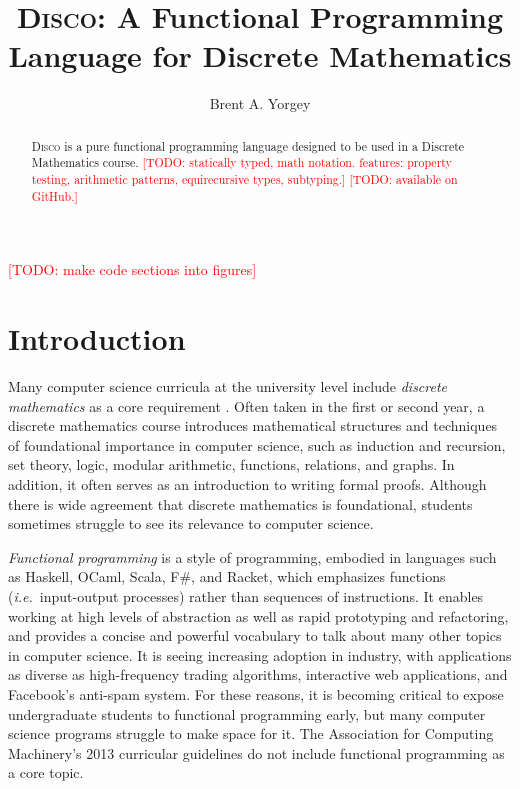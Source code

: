 \documentclass[submission,copyright,creativecommons]{eptcs}
\title{\textsc{Disco}: A Functional Programming Language for Discrete Mathematics}
\author{Brent A. Yorgey
\institute{Hendrix College\\ Conway, Arkansas, USA}
\email{yorgey@hendrix.edu}
}
\newcommand{\disco}{\textsc{Disco}\xspace}
\newcommand{\todo}[1]{\textcolor{red}{[TODO: #1]}}
\newcommand{\todo}[1]{}
\begin{document}
\maketitle

\todo{make code sections into figures}

\begin{abstract}
  \disco is a pure functional programming language designed to be used
  in a Discrete Mathematics course. \todo{statically typed, math
  notation. features: property testing, arithmetic patterns, equirecursive
  types, subtyping.}
  \todo{available on GitHub.}
\end{abstract}

\section{Introduction}
\label{sec:introduction}

Many computer science curricula at the university level include
\emph{discrete mathematics} as a core requirement \cite{ACM:2013}.
Often taken in the first or second year, a discrete mathematics course
introduces mathematical structures and techniques of foundational
importance in computer science, such as induction and recursion, set
theory, logic, modular arithmetic, functions, relations, and graphs.
In addition, it often serves as an introduction to writing formal
proofs.  Although there is wide agreement that discrete mathematics is
foundational, students sometimes struggle to see its relevance to
computer science.

\emph{Functional programming} is a style of programming, embodied in
languages such as Haskell, OCaml, Scala, F\#, and Racket, which
emphasizes functions (\emph{i.e.}\ input-output processes) rather than
sequences of instructions. It enables working at high levels of
abstraction as well as rapid prototyping and refactoring, and provides
a concise and powerful vocabulary to talk about many other topics in
computer science. It is seeing increasing adoption in industry, with
applications as diverse as high-frequency trading algorithms,
interactive web applications, and Facebook's anti-spam system.  For
these reasons, it is becoming critical to expose undergraduate
students to functional programming early, but many computer science
programs struggle to make space for it.  The Association for Computing
Machinery's 2013 curricular guidelines \cite{ACM:2013} do not include
functional programming as a core topic.
\end{document}
